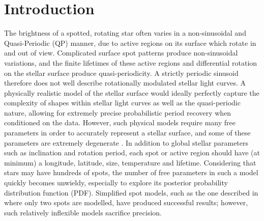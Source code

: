 \documentclass[useAMS, usenatbib, preprint, 12pt]{aastex}
\newcommand{\eg}{{\it e.g.}}
\begin{document}
\section{Introduction}

The brightness of a spotted, rotating star often varies in a non-sinusoidal and
Quasi-Periodic (QP) manner, due to active regions on its surface which
rotate in and out of view.
Complicated surface spot patterns produce non-sinusoidal variations,
and the finite lifetimes of these active regions and
differential rotation on the stellar surface produce quasi-periodicity.
A strictly periodic sinusoid therefore does not well describe 
rotationally modulated stellar light curves.
A physically realistic model of the stellar surface 
would ideally perfectly capture the complexity of shapes
within stellar light curves as well as the quasi-periodic nature, allowing for
extremely precise probabilistic period recovery when conditioned on the data.
However, such physical models require many free parameters in order to
accurately represent a stellar surface, and some of these parameters are
extremely degenerate \citep[\eg][]{Russell1906, Jeffers2009, Kipping2012}.
In addition to global stellar parameters such as inclination and rotation
period, each spot or active region should have (at minimum) a longitude,
latitude, size, temperature and lifetime.
Considering that stars may have hundreds of spots, the number
of free parameters in such a model quickly becomes unwieldy, especially to explore
its posterior probability distribution function (PDF).
Simplified spot models, such as the one described in \citet{Lanza2014} where
only two spots are modelled, have produced successful results; however, such 
relatively inflexible models sacrifice precision. 
\end{document}
